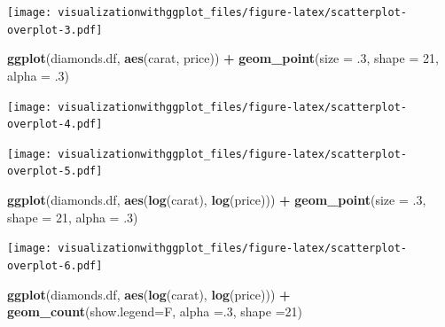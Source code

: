 \documentclass[]{krantz}
\makeatletter
\newenvironment{Shaded}{\begin{snugshade}}{\end{snugshade}}
\newcommand{\DataTypeTok}[1]{\textcolor[rgb]{0.13,0.29,0.53}{#1}}
\newcommand{\DecValTok}[1]{\textcolor[rgb]{0.00,0.00,0.81}{#1}}
\newcommand{\FloatTok}[1]{\textcolor[rgb]{0.00,0.00,0.81}{#1}}
\newcommand{\KeywordTok}[1]{\textcolor[rgb]{0.13,0.29,0.53}{\textbf{#1}}}
\newcommand{\NormalTok}[1]{#1}
\newcommand{\OperatorTok}[1]{\textcolor[rgb]{0.81,0.36,0.00}{\textbf{#1}}}
\newcommand{\StringTok}[1]{\textcolor[rgb]{0.31,0.60,0.02}{#1}}
\newenvironment{kframe}{%
\medskip{}
\setlength{\fboxsep}{.8em}
 \def\at@end@of@kframe{}%
 \ifinner\ifhmode%
  \def\at@end@of@kframe{\end{minipage}}%
  \begin{minipage}{\columnwidth}%
 \fi\fi%
 \def\FrameCommand##1{\hskip\@totalleftmargin \hskip-\fboxsep
 \colorbox{shadecolor}{##1}\hskip-\fboxsep
     \hskip-\linewidth \hskip-\@totalleftmargin \hskip\columnwidth}%
 \MakeFramed {\advance\hsize-\width
   \@totalleftmargin\z@ \linewidth\hsize
   \@setminipage}}%
 {\par\unskip\endMakeFramed%
 \at@end@of@kframe}
\renewenvironment{Shaded}{\begin{kframe}}{\end{kframe}}
\makeatother
\begin{document}
\texttt{[image: visualizationwithggplot\_files/figure-latex/scatterplot-overplot-3.pdf]}

\begin{Shaded}
\begin{Highlighting}[]
\KeywordTok{ggplot}\NormalTok{(diamonds.df, }\KeywordTok{aes}\NormalTok{(carat, price)) }\OperatorTok{+}
\StringTok{  }\KeywordTok{geom_point}\NormalTok{(}\DataTypeTok{size =} \FloatTok{.3}\NormalTok{, }\DataTypeTok{shape =} \DecValTok{21}\NormalTok{, }\DataTypeTok{alpha =} \FloatTok{.3}\NormalTok{)}
\end{Highlighting}
\end{Shaded}

\texttt{[image: visualizationwithggplot\_files/figure-latex/scatterplot-overplot-4.pdf]}

\begin{Shaded}
\end{Shaded}

\texttt{[image: visualizationwithggplot\_files/figure-latex/scatterplot-overplot-5.pdf]}

\begin{Shaded}
\begin{Highlighting}[]
\KeywordTok{ggplot}\NormalTok{(diamonds.df, }\KeywordTok{aes}\NormalTok{(}\KeywordTok{log}\NormalTok{(carat), }\KeywordTok{log}\NormalTok{(price))) }\OperatorTok{+}
\StringTok{  }\KeywordTok{geom_point}\NormalTok{(}\DataTypeTok{size =} \FloatTok{.3}\NormalTok{, }\DataTypeTok{shape =} \DecValTok{21}\NormalTok{, }\DataTypeTok{alpha =} \FloatTok{.3}\NormalTok{)}
\end{Highlighting}
\end{Shaded}

\texttt{[image: visualizationwithggplot\_files/figure-latex/scatterplot-overplot-6.pdf]}

\begin{Shaded}
\begin{Highlighting}[]
\KeywordTok{ggplot}\NormalTok{(diamonds.df, }\KeywordTok{aes}\NormalTok{(}\KeywordTok{log}\NormalTok{(carat), }\KeywordTok{log}\NormalTok{(price))) }\OperatorTok{+}
\StringTok{  }\KeywordTok{geom_count}\NormalTok{(}\DataTypeTok{show.legend=}\NormalTok{F, }\DataTypeTok{alpha =}\NormalTok{.}\DecValTok{3}\NormalTok{, }\DataTypeTok{shape =}\DecValTok{21}\NormalTok{)}
\end{Highlighting}
\end{Shaded}
\end{document}
